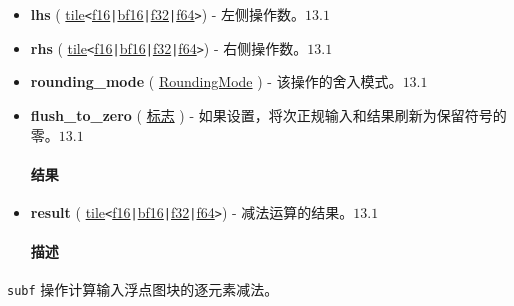 \documentclass{article}
\begin{document}
\begin{itemize}
\item \textbf{lhs} ( \href{https://docs.nvidia.com/cuda/tile-ir/latest/sections/types.html#type-tile}{tile}\texttt{<}\href{https://docs.nvidia.com/cuda/tile-ir/latest/sections/types.html#subsection-element-types}{f16}\texttt{|}\href{https://docs.nvidia.com/cuda/tile-ir/latest/sections/types.html#subsection-element-types}{bf16}\texttt{|}\href{https://docs.nvidia.com/cuda/tile-ir/latest/sections/types.html#subsection-element-types}{f32}\texttt{|}\href{https://docs.nvidia.com/cuda/tile-ir/latest/sections/types.html#subsection-element-types}{f64}\texttt{>}) - 左侧操作数。$\boxed{13.1}$
\item \textbf{rhs} ( \href{https://docs.nvidia.com/cuda/tile-ir/latest/sections/types.html#type-tile}{tile}\texttt{<}\href{https://docs.nvidia.com/cuda/tile-ir/latest/sections/types.html#subsection-element-types}{f16}\texttt{|}\href{https://docs.nvidia.com/cuda/tile-ir/latest/sections/types.html#subsection-element-types}{bf16}\texttt{|}\href{https://docs.nvidia.com/cuda/tile-ir/latest/sections/types.html#subsection-element-types}{f32}\texttt{|}\href{https://docs.nvidia.com/cuda/tile-ir/latest/sections/types.html#subsection-element-types}{f64}\texttt{>}) - 右侧操作数。$\boxed{13.1}$
\item \textbf{rounding\_mode} ( \href{https://docs.nvidia.com/cuda/tile-ir/latest/sections/operations.html#op-attribute-cuda-tile-subf-roundingmode-attr}{RoundingMode} ) - 该操作的舍入模式。$\boxed{13.1}$
\item \textbf{flush\_to\_zero} ( \href{https://docs.nvidia.com/cuda/tile-ir/latest/sections/operations.html#type-flag}{标志} ) - 如果设置，将次正规输入和结果刷新为保留符号的零。$\boxed{13.1}$




\paragraph{结果}


\item \textbf{result} ( \href{https://docs.nvidia.com/cuda/tile-ir/latest/sections/types.html#type-tile}{tile}\texttt{<}\href{https://docs.nvidia.com/cuda/tile-ir/latest/sections/types.html#subsection-element-types}{f16}\texttt{|}\href{https://docs.nvidia.com/cuda/tile-ir/latest/sections/types.html#subsection-element-types}{bf16}\texttt{|}\href{https://docs.nvidia.com/cuda/tile-ir/latest/sections/types.html#subsection-element-types}{f32}\texttt{|}\href{https://docs.nvidia.com/cuda/tile-ir/latest/sections/types.html#subsection-element-types}{f64}\texttt{>}) - 减法运算的结果。$\boxed{13.1}$




\paragraph{描述}


\end{itemize}
\texttt{subf} 操作计算输入浮点图块的逐元素减法。
\end{document}
